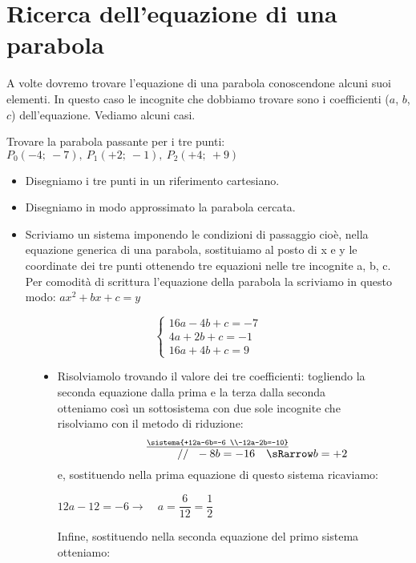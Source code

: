 \section{Ricerca dell'equazione di una parabola}
\label{sec:parabola_altreparabole}

A volte dovremo trovare l'equazione di una parabola conoscendone alcuni suoi 
elementi. In questo caso le incognite che dobbiamo trovare sono i coefficienti 
(\(a\), \(b\), \(c\)) dell'equazione. Vediamo alcuni casi.

\begin{esempio}
 Trovare la parabola passante per i tre 
 punti:~\(P_0(-4;~-7),~ P_1(+2;~-1),~ P_2(+4;~+9)\)
 
 \begin{itemize}
  \item Disegniamo i tre punti in un riferimento cartesiano.
  \item Disegniamo in modo approssimato la parabola cercata.
  \item Scriviamo un sistema imponendo le condizioni di passaggio cioè, 
   nella equazione generica di una parabola, sostituiamo al posto di x e y 
   le coordinate dei tre punti ottenendo tre equazioni nelle tre 
   incognite a, b, c. Per comodità di scrittura l'equazione della parabola la 
   scriviamo in questo modo: \(ax^2+bx+c=y\)
 \end{itemize}
\begin{figure}[h]
\begin{minipage}{.60\textwidth}
\[\left\{\begin{array}{l}
  16a-4b+c=-7\\
  4a+2b+c=-1\\
  16a+4b+c=9
\end{array}\right. \]
\begin{itemize}
\item Risolviamolo trovando il valore dei tre coefficienti:
togliendo la seconda equazione dalla prima e la terza dalla seconda 
otteniamo così un sottosistema con due sole incognite che risolviamo con 
il metodo di riduzione:
\[\stackrel{\underline{\sistema{+12a-6b=-6 \\-12a-2b=-10}}}
  {\qquad \qquad \qquad ~~~~~~ // ~~ -8b =-16 \quad \sRarrow b=+2}\]
e, sostituendo nella prima equazione di questo sistema ricaviamo:

\(12a-12=-6 \rightarrow \quad a=\dfrac{6}{12}=\dfrac{1}{2}\)

Infine, sostituendo nella seconda equazione del primo sistema otteniamo:


\end{itemize}
\end{minipage}
\end{figure}
\end{esempio}
